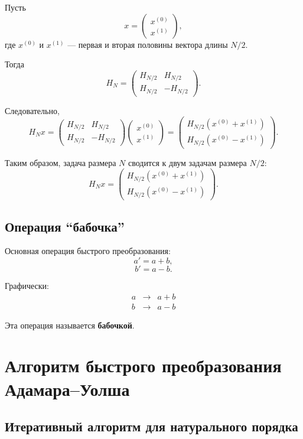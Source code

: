 \documentclass[12pt,a4paper]{article}
\begin{document}
Пусть
\[
    x=
    \begin{pmatrix}
        x^{(0)}\\
        x^{(1)}
    \end{pmatrix},
\]
где $x^{(0)}$ и $x^{(1)}$ --- первая и вторая половины вектора длины $N/2$.

Тогда
\[
H_N=
\begin{pmatrix}
H_{N/2}&H_{N/2}\\
H_{N/2}&-H_{N/2}
\end{pmatrix}.
\]

Следовательно,
\[
H_Nx
=
\begin{pmatrix}
H_{N/2}&H_{N/2}\\
H_{N/2}&-H_{N/2}
\end{pmatrix}
\begin{pmatrix}
x^{(0)}\\
x^{(1)}
\end{pmatrix}
=
\begin{pmatrix}
H_{N/2}(x^{(0)}+x^{(1)})\\
H_{N/2}(x^{(0)}-x^{(1)})
\end{pmatrix}.
\]

Таким образом, задача размера $N$ сводится к двум задачам размера $N/2$:
\[
    H_Nx
    =
    \begin{pmatrix}
        H_{N/2}(x^{(0)}+x^{(1)})\\
        H_{N/2}(x^{(0)}-x^{(1)})
    \end{pmatrix}.
\]

\subsection{Операция ``бабочка''}

Основная операция быстрого преобразования:
\[
    a'=a+b,
\]
\[
    b'=a-b.
\]

Графически:
\[
\begin{array}{ccc}
a & \longrightarrow & a+b\\
b & \longrightarrow & a-b
\end{array}
\]

Эта операция называется \textbf{бабочкой}.

\section{Алгоритм быстрого преобразования Адамара--Уолша}

\subsection{Итеративный алгоритм для натурального порядка}
\end{document}
